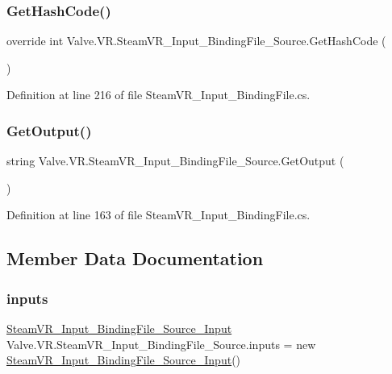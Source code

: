 \subsubsection{\texorpdfstring{GetHashCode()}{GetHashCode()}}
{\footnotesize\ttfamily override int Valve.\+V\+R.\+Steam\+V\+R\+\_\+\+Input\+\_\+\+Binding\+File\+\_\+\+Source.\+Get\+Hash\+Code (\begin{DoxyParamCaption}{ }\end{DoxyParamCaption})}



Definition at line 216 of file Steam\+V\+R\+\_\+\+Input\+\_\+\+Binding\+File.\+cs.

\mbox{\label{class_valve_1_1_v_r_1_1_steam_v_r___input___binding_file___source_a4db472a7504c576072a82cf5c23894a6}} 
\subsubsection{\texorpdfstring{GetOutput()}{GetOutput()}}
{\footnotesize\ttfamily string Valve.\+V\+R.\+Steam\+V\+R\+\_\+\+Input\+\_\+\+Binding\+File\+\_\+\+Source.\+Get\+Output (\begin{DoxyParamCaption}{ }\end{DoxyParamCaption})}



Definition at line 163 of file Steam\+V\+R\+\_\+\+Input\+\_\+\+Binding\+File.\+cs.



\subsection{Member Data Documentation}
\mbox{\label{class_valve_1_1_v_r_1_1_steam_v_r___input___binding_file___source_a5a70ce192dec4a33445721f0843f1642}} 
\subsubsection{\texorpdfstring{inputs}{inputs}}
{\footnotesize\ttfamily \mbox{\hyperlink{class_valve_1_1_v_r_1_1_steam_v_r___input___binding_file___source___input}{Steam\+V\+R\+\_\+\+Input\+\_\+\+Binding\+File\+\_\+\+Source\+\_\+\+Input}} Valve.\+V\+R.\+Steam\+V\+R\+\_\+\+Input\+\_\+\+Binding\+File\+\_\+\+Source.\+inputs = new \mbox{\hyperlink{class_valve_1_1_v_r_1_1_steam_v_r___input___binding_file___source___input}{Steam\+V\+R\+\_\+\+Input\+\_\+\+Binding\+File\+\_\+\+Source\+\_\+\+Input}}()}



